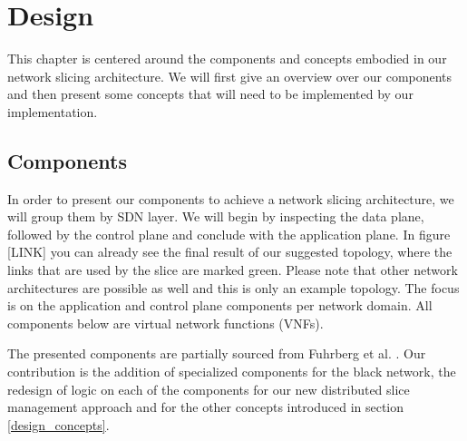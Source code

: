 \chapter{Design}
\iffalse
\begin{itemize}
    \item Components
    \begin{itemize}
        \item Overview
        \item ESMF \& CTMF
        \item DSMF \& DTMF
        \item Controller
        \item SDN Switch
        \item VPN Gateway
    \end{itemize}
    \item Concepts
    \begin{itemize}
        \item Distributed trust and authority
        \item State synchronization (2PCP)
        \item Strict separation of SDN layers
    \end{itemize}
\end{itemize}
\fi
This chapter is centered around the components and concepts embodied in our network slicing architecture. We will first give an overview over our components and then present some concepts that will need to be implemented by our implementation.

\section{Components}
In order to present our components to achieve a network slicing architecture, we will group them by SDN layer. We will begin by inspecting the data plane, followed by the control plane and conclude with the application plane. In figure [LINK] you can already see the final result of our suggested topology, where the links that are used by the slice are marked green. Please note that other network architectures are possible as well and this is only an example topology. The focus is on the application and control plane components per network domain. All components below are virtual network functions (VNFs).

The presented components are partially sourced from Fuhrberg et al. \cite{SE4}. Our contribution is the addition of specialized components for the black network, the redesign of logic on each of the components for our new distributed slice management approach and for the other concepts introduced in section \ref{design_concepts}.

